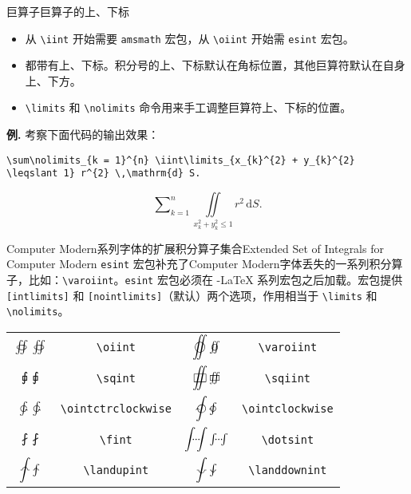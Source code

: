 \documentclass[mathserif]{beamer}
\newcommand{\codegreen}[1]{\textcolor{codegreen}{#1}}
\newenvironment{instance}{\zihao{-5}\textbf{\songti \codegreen{例.}}}{\hfill\par}
\begin{document}
\begin{frame}[fragile]{巨算子}{巨算子的上、下标}
\begin{itemize}

\item 从 \lstinline'\iint' 开始需要 \verb'amsmath' 宏包，从 \lstinline'\oiint' 开始需 \verb'esint' 宏包。

\item 都带有上、下标。积分号的上、下标默认在角标位置，其他巨算符默认在自身上、下方。

\item \lstinline'\limits' 和 \lstinline'\nolimits' 命令用来手工调整巨算符上、下标的位置。

\end{itemize}

\begin{instance}
考察下面代码的输出效果：
\begin{lstlisting}[numbers=none]
\sum\nolimits_{k = 1}^{n} \iint\limits_{x_{k}^{2} + y_{k}^{2} \leqslant 1} r^{2} \,\mathrm{d} S.
\end{lstlisting}%
\noindent
\begin{equation*}
	\sum\nolimits_{k = 1}^{n} \iint\limits_{x_{k}^{2} + y_{k}^{2} \leqslant 1} r^{2} \,\mathrm{d} S.
\end{equation*}
\end{instance}
\end{frame}

\begin{frame}[fragile]{Computer Modern系列字体的扩展积分算子集合}{Extended Set of Integrals for Computer Modern}
\verb'esint' 宏包补充了Computer Modern字体丢失的一系列积分算子，比如：\lstinline'\varoiint'。{\color{red}\verb'esint' 宏包必须在 \AmS-\LaTeX{} 系列宏包之后加载。}宏包提供 \lstinline'[intlimits]' 和 \lstinline'[nointlimits]'（默认）两个选项，作用相当于 \lstinline'\limits' 和 \lstinline'\nolimits'。\cite{esint}
\begin{table}[H]
\centering
\begin{tabular}{cc|cc}
	\toprule
	$\displaystyle \oiint \textstyle \oiint$ & \lstinline'\oiint' & $\displaystyle \varoiint \textstyle \varoiint$ & \lstinline'\varoiint' \\
	$\displaystyle \sqint \textstyle \sqint$ & \lstinline'\sqint' & $\displaystyle \sqiint \textstyle \sqiint$ & \lstinline'\sqiint' \\
	$\displaystyle \ointctrclockwise \textstyle \ointctrclockwise$ & \lstinline'\ointctrclockwise' & $\displaystyle \ointclockwise \textstyle \ointclockwise$ & \lstinline'\ointclockwise' \\
	$\displaystyle \fint \textstyle \fint$ & \lstinline'\fint' & $\displaystyle \dotsint \textstyle \dotsint$ & \lstinline'\dotsint' \\
	$\displaystyle \landupint \textstyle \landupint$ & \lstinline'\landupint' & $\displaystyle \landdownint \textstyle \landdownint$ & \lstinline'\landdownint' \\
	\bottomrule
\end{tabular}
\end{table}
\end{frame}
\end{document}
